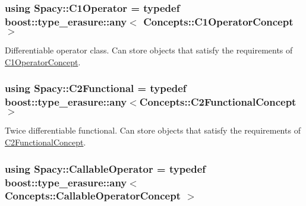 \subsubsection[{C1\+Operator}]{\setlength{\rightskip}{0pt plus 5cm}using {\bf Spacy\+::\+C1\+Operator} = typedef boost\+::type\+\_\+erasure\+::any$<$ {\bf Concepts\+::\+C1\+Operator\+Concept} $>$}\label{group__SpacyGroup_ga87ae8cb0d7a567a4bb181e0a9f182620_ga87ae8cb0d7a567a4bb181e0a9f182620}


Differentiable operator class. Can store objects that satisfy the requirements of \hyperlink{group__ConceptGroup_ga14a12c741dc237e32862fa4bc315451b_C1OperatorConceptAnchor}{C1\+Operator\+Concept}. 

\label{group__SpacyGroup_ga87ae8cb0d7a567a4bb181e0a9f182620_C1OperatorAnchor}%
\hypertarget{group__SpacyGroup_ga87ae8cb0d7a567a4bb181e0a9f182620_C1OperatorAnchor}{}%
\hypertarget{group__SpacyGroup_gaf5b89e117806134b06a1ce4629fb2b65_gaf5b89e117806134b06a1ce4629fb2b65}{}
\subsubsection[{C2\+Functional}]{\setlength{\rightskip}{0pt plus 5cm}using {\bf Spacy\+::\+C2\+Functional} = typedef boost\+::type\+\_\+erasure\+::any$<${\bf Concepts\+::\+C2\+Functional\+Concept}$>$}\label{group__SpacyGroup_gaf5b89e117806134b06a1ce4629fb2b65_gaf5b89e117806134b06a1ce4629fb2b65}


Twice differentiable functional. Can store objects that satisfy the requirements of \hyperlink{group__ConceptGroup_gafb4414561b07b27100cad81ecf152e47_C2FunctionalConceptAnchor}{C2\+Functional\+Concept}. 

\label{group__SpacyGroup_gaf5b89e117806134b06a1ce4629fb2b65_C2FunctionalAnchor}%
\hypertarget{group__SpacyGroup_gaf5b89e117806134b06a1ce4629fb2b65_C2FunctionalAnchor}{}%
\hypertarget{group__SpacyGroup_ga2b74020d806ad800795cdd97dab3466f_ga2b74020d806ad800795cdd97dab3466f}{}
\subsubsection[{Callable\+Operator}]{\setlength{\rightskip}{0pt plus 5cm}using {\bf Spacy\+::\+Callable\+Operator} = typedef boost\+::type\+\_\+erasure\+::any$<$ {\bf Concepts\+::\+Callable\+Operator\+Concept} $>$}\label{group__SpacyGroup_ga2b74020d806ad800795cdd97dab3466f_ga2b74020d806ad800795cdd97dab3466f}


